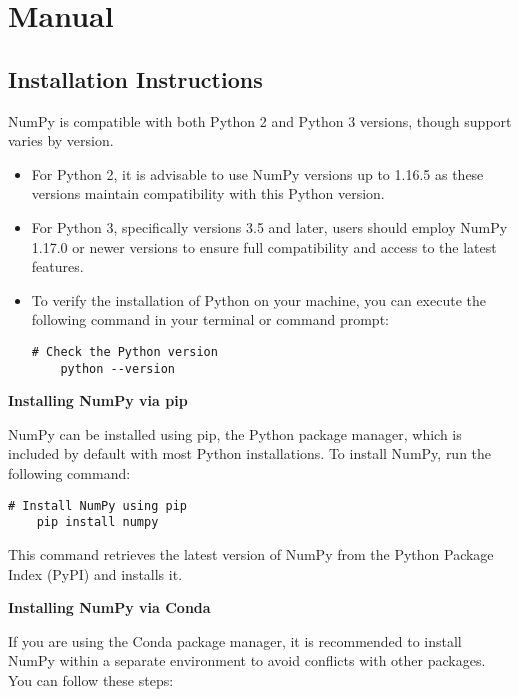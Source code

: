 \section{Manual}

\subsection{Installation Instructions}

NumPy is compatible with both Python 2 and Python 3 versions, though support varies by version.

\begin{itemize}
	\item For Python 2, it is advisable to use NumPy versions up to 1.16.5 as these versions maintain compatibility with this Python version.
	\item For Python 3, specifically versions 3.5 and later, users should employ NumPy 1.17.0 or newer versions to ensure full compatibility and access to the latest features.
	\item To verify the installation of Python on your machine, you can execute the following command in your terminal or command prompt:
	
\begin{lstlisting}[caption={Example command to check Python version}, label={code:python-version}, style=pythonstyle]
	# Check the Python version
	python --version
\end{lstlisting}

\end{itemize}

\textbf{Installing NumPy via pip}

NumPy can be installed using pip, the Python package manager, which is included by default with most Python installations. To install NumPy, run the following command:

\begin{lstlisting}[caption={Example command to install NumPy using pip}, label={code:install-numpy}, style=pythonstyle]
	# Install NumPy using pip
	pip install numpy
\end{lstlisting}

This command retrieves the latest version of NumPy from the Python Package Index (PyPI) and installs it.

\vspace{1em}

\textbf{Installing NumPy via Conda}

If you are using the Conda package manager, it is recommended to install NumPy within a separate environment to avoid conflicts with other packages. You can follow these steps:

